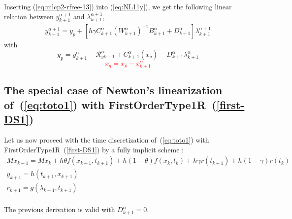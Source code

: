 Inserting (\ref{eq:mlcp2-rfree-13}) into (\ref{eq:NL11y}), we get the following linear relation between $y^{\alpha+1}_{k+1}$ and $\lambda^{\alpha+1}_{k+1}$, 
\begin{equation}
   \begin{array}{l}
 y^{\alpha+1}_{k+1} = y_p + \left[ h \gamma C^{\alpha}_{k+1} ( W^{\alpha}_{k+1})^{-1}  B^{\alpha}_{k+1} + D^{\alpha}_{k+1} \right]\lambda^{\alpha+1}_{k+1}
   \end{array}
\end{equation}
with 
\begin{equation}\boxed{
y_p = y^{\alpha}_{k+1} -\mathcal R^{\alpha}_{yk+1} + C^{\alpha}_{k+1}(x_q) -
D^{\alpha}_{k+1} \lambda^{\alpha}_{k+1} }
\end{equation}
\textcolor{red}{
  \begin{equation}
    \boxed{ x_q= x_p - x^{\alpha}_{k+1}\label{eq:mlcp2-xqq}}
  \end{equation}
}

\subsection{The special case of Newton's linearization of~(\ref{eq:toto1}) with FirstOrderType1R~(\ref{first-DS1})} 


Let us now proceed with the time discretization of~(\ref{eq:toto1}) with FirstOrderType1R~(\ref{first-DS1})  by a fully implicit scheme : 
\begin{equation}
  \begin{array}{l}
    \label{eq:mlcp3-toto1-DS2}
     M x_{k+1} = M x_{k} +h\theta f(x_{k+1},t_{k+1})+h(1-\theta) f(x_k,t_k) + h \gamma r(t_{k+1})
     + h(1-\gamma)r(t_k)  \\[2mm]
     y_{k+1} =  h(t_{k+1},x_{k+1}) \\[2mm]
     r_{k+1} = g(\lambda_{k+1},t_{k+1})\\[2mm]
  \end{array}
\end{equation}

The previous derivation is valid with $ D^{\alpha}_{k+1} =0$.




\clearpage


